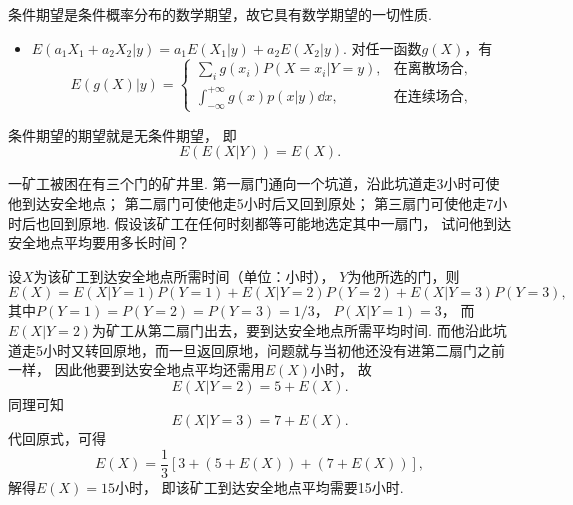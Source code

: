条件期望是条件概率分布的数学期望，故它具有数学期望的一切性质.
\begin{itemize}
	\item \(E(a_1 X_1 + a_2 X_2 \vert y)
	= a_1 E(X_1 \vert y) + a_2 E(X_2 \vert y)\).
	对任一函数\(g(X)\)，有\begin{equation*}
		E(g(X) \vert y)
		= \left\{ \begin{array}{cl}
			\sum_i g(x_i) P(X=x_i \vert Y = y),
			& \text{在离散场合}, \\
			\int_{-\infty}^{+\infty} g(x) p(x \vert y) \dd{x},
			& \text{在连续场合},
		\end{array} \right.
	\end{equation*}
\end{itemize}

\begin{theorem}\label{theorem:条件期望.条件期望与期望的关系}
条件期望的期望就是无条件期望，
即\begin{equation}
	E(E(X \vert Y)) = E(X).
\end{equation}
\end{theorem}

\begin{example}
一矿工被困在有三个门的矿井里.
第一扇门通向一个坑道，沿此坑道走3小时可使他到达安全地点；
第二扇门可使他走5小时后又回到原处；
第三扇门可使他走7小时后也回到原地.
假设该矿工在任何时刻都等可能地选定其中一扇门，
试问他到达安全地点平均要用多长时间？
\begin{solution}
设\(X\)为该矿工到达安全地点所需时间（单位：小时），
\(Y\)为他所选的门，则\begin{equation*}
	E(X)
	= E(X \vert Y=1) P(Y=1)
	+ E(X \vert Y=2) P(Y=2)
	+ E(X \vert Y=3) P(Y=3),
\end{equation*}
其中\(P(Y=1) = P(Y=2) = P(Y=3) = 1/3\)，
\(P(X \vert Y=1) = 3\)，
而\(E(X \vert Y=2)\)为矿工从第二扇门出去，要到达安全地点所需平均时间.
而他沿此坑道走5小时又转回原地，而一旦返回原地，问题就与当初他还没有进第二扇门之前一样，
因此他要到达安全地点平均还需用\(E(X)\)小时，
故\begin{equation*}
	E(X \vert Y=2)
	= 5 + E(X).
\end{equation*}
同理可知\begin{equation*}
	E(X \vert Y=3)
	= 7 + E(X).
\end{equation*}
代回原式，可得\begin{equation*}
	E(X) = \frac13[ 3 + (5 + E(X)) + (7 + E(X)) ],
\end{equation*}
解得\(E(X) = 15\)小时，
即该矿工到达安全地点平均需要15小时.
\end{solution}
\end{example}
